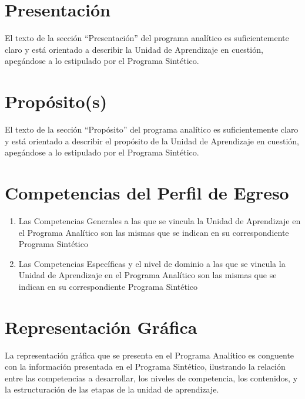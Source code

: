 \documentclass{article}
\newcommand{\sino}{\hfill \CheckBox[checkboxsymbol=\ding{56}]{S\'{i}}\quad\CheckBox[checkboxsymbol=\ding{56}]{No}}
\begin{document}
\begin{Form}
\begin{enumerate}[resume,leftmargin=*,nolistsep]
\end{enumerate}
  
\section{Presentaci\'{o}n}

El texto de la secci\'{o}n ``Presentaci\'{o}n'' del programa
anal\'{i}tico es suficientemente claro y est\'{a} orientado a
describir la Unidad de Aprendizaje en cuesti\'{o}n, apeg\'{a}ndose a
lo estipulado por el Programa Sint\'{e}tico. \sino

\section{Prop\'{o}sito(s)}

El texto de la secci\'{o}n ``Prop\'{o}sito'' del programa
anal\'{i}tico es suficientemente claro y est\'{a} orientado a
describir el prop\'{o}sito de la Unidad de Aprendizaje en
cuesti\'{o}n, apeg\'{a}ndose a lo estipulado por el Programa
Sint\'{e}tico. \sino

\section{Competencias del Perfil de Egreso}

\begin{enumerate}[resume,leftmargin=*,nolistsep]
\item{Las Competencias Generales a las que se vincula la Unidad de Aprendizaje en el
Programa Anal\'{i}tico son las mismas que se indican en su correspondiente Programa
Sint\'{e}tico \sino}
\item{Las Competencias Espec\'{i}ficas y el nivel de dominio a las que se vincula la Unidad de
Aprendizaje en el Programa Anal\'{i}tico son las mismas que se indican en su correspondiente
Programa Sint\'{e}tico \sino}
\end{enumerate}

\section{Representaci\'{o}n Gr\'{a}fica}

La representaci\'{o}n gr\'{a}fica que se presenta en el Programa Anal\'{i}tico es conguente con la
informaci\'{o}n presentada en el Programa Sint\'{e}tico, ilustrando la relaci\'{o}n entre las
competencias a desarrollar, los niveles de competencia, los contenidos, y la estructuraci\'{o}n
de las etapas de la unidad de aprendizaje. \sino


\end{Form}
\end{document}
